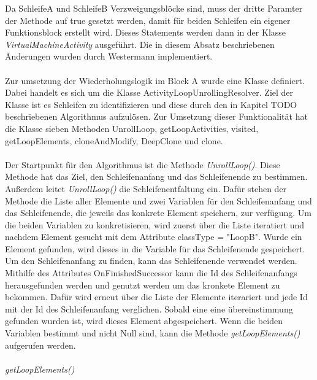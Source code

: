 \documentclass{article}
\begin{document}
    Da SchleifeA und SchleifeB Verzweigungsblöcke sind, muss der dritte Paramter der Methode auf true gesetzt werden, damit für beiden Schleifen ein eigener Funktionsblock erstellt wird.
    Dieses Statements werden dann in der Klasse \textit{VirtualMachineActivity} ausgeführt.
    Die in diesem Absatz beschriebenen Änderungen wurden durch Westermann implementiert.\\
    \\
    Zur umsetzung der Wiederholungslogik im Block A wurde eine Klasse definiert.
    Dabei handelt es sich um die Klasse ActivityLoopUnrollingResolver.
    Ziel der Klasse ist es Schleifen zu identifizieren und diese durch den in Kapitel TODO beschriebenen Algorithmus aufzulösen.
    Zur Umsetzung dieser Funktionalität hat die Klasse sieben Methoden UnrollLoop, getLoopActivities, visited, getLoopElements, cloneAndModify, DeepClone und clone.\\
    \\
    Der Startpunkt für den Algorithmus ist die Methode \textit{UnrollLoop()}.
    Diese Methode hat das Ziel, den Schleifenanfang und das Schleifenende zu bestimmen. 
    Außerdem leitet \textit{UnrollLoop()} die Schleifenentfaltung ein.
    Dafür stehen der Methode die Liste aller Elemente und zwei Variablen für den Schleifenanfang und das Schleifenende, die jeweils das konkrete Element speichern, zur verfügung.
    Um die beiden Variablen zu konkretisieren, wird zuerst über die Liste iteratiert und nachdem Element gesucht mit dem Attribute classType = "LoopB".  %
    Wurde ein Element gefunden, wird dieses in die Variable für das Schleifenende gespeichert.
    Um den Schleifenanfang zu finden, kann das Schleifenende verwendet werden.
    Mithilfe des Attributes OnFinishedSuccessor kann die Id des Schleifenanfangs herausgefunden werden und genutzt werden um das kronkete Element zu bekommen.
    Dafür wird erneut über die Liste der Elemente iterariert und jede Id mit der Id des Schleifenanfang verglichen.
    Sobald eine eine übereinstimmung gefunden wurden ist, wird dieses Element abgespeichert. 
    Wenn die beiden Variablen bestimmt und nicht Null sind, kann die Methode \textit{getLoopElements()} aufgerufen werden.\\
    \\
    \textit{getLoopElements()} 
\end{document}
